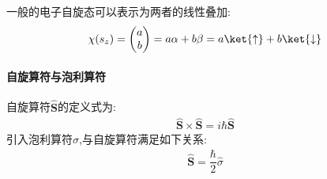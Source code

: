     一般的电子自旋态可以表示为两者的线性叠加:
    $$\chi(s_z)=\begin{pmatrix}
        a\\
        b
    \end{pmatrix}=a\alpha+b\beta=a\ket{\uparrow}+b\ket{\downarrow}$$
    \paragraph*{自旋算符与泡利算符}
    自旋算符$\hat{\mathbf{S}}$的定义式为:
    \begin{align}
        \hat{\mathbf{S}}\times\hat{\mathbf{S}}=i\hbar\hat{\mathbf{S}}
    \end{align}
    引入泡利算符$\hat{\sigma}$,与自旋算符满足如下关系:
    \begin{align}
        \hat{\mathbf{S}}=\dfrac{\hbar}{2} \hat{\sigma}
    \end{align}
